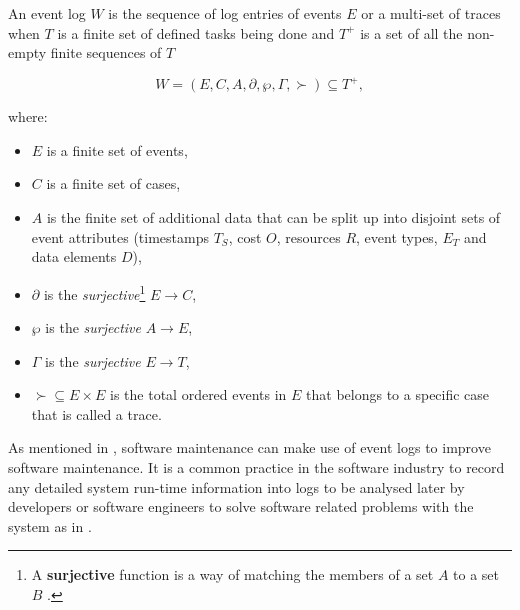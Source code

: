An event log $W$ is the sequence of log entries of events $E$ or a multi-set of traces when $T$ is a finite set of defined tasks being done and $T^+$ is a set of all the non-empty finite sequences of $T$ \cite{Kherbouche2017}

\begin{equation}
	\label{eq:LogEvent}
	W = (E, C, A, \partial, \wp, \Gamma, \succ) \subseteq T^+,
\end{equation}

where:

\begin{itemize}
	\item $E$ is a finite set of events,
	\item $C$ is a finite set of cases,
	\item $A$ is the finite set of additional data that can be split up into disjoint sets of event attributes (timestamps $T_S$, cost $O$, resources $R$, event types, $E_T$ and data elements $D$),
	\item $\partial$ is the \textit{surjective}\footnote{\label{ftn:Surjective}A \textbf{surjective} function is a way of matching the members of a set $A$ to a set $B$ \cite{Szendrei1990}.} $E\rightarrow C$,
	\item $\wp$ is the \textit{surjective} $A\rightarrow E$,
	\item $\Gamma$ is the \textit{surjective} $E\rightarrow T$,
	\item $\succ \subseteq E\times E$ is the total ordered events in $E$ that belongs to a specific case that is called a trace.
\end{itemize}

As mentioned in , software maintenance can make use of event logs to improve software maintenance. It is a common practice in the software industry to record any detailed system run-time information into logs to be analysed later by developers or software engineers to solve software related problems with the system as in  \cite{Zhu2019}.

